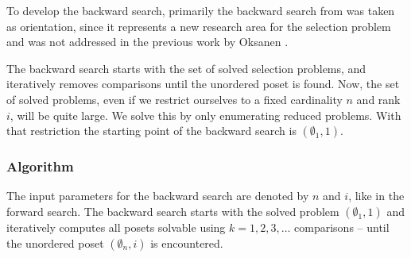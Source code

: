 \documentclass[twoside,leqno,twocolumn]{article}
\begin{document}

To develop the backward search, primarily the backward search from \cite{stober2022lower} was taken as orientation, since it represents a new research area for the selection problem and was not addressed in the previous work by Oksanen \cite{Oksanen}.

The backward search starts with the set of solved selection problems, and iteratively removes comparisons until the unordered poset is found.
Now, the set of solved problems, even if we restrict ourselves to a fixed cardinality $n$ and rank $i$, will be quite large.
We solve this by only enumerating reduced problems.
With that restriction the starting point of the backward search is $(\emptyset_1, 1)$.

%



\subsubsection{Algorithm} \label{sec:backward:algorithm}
The input parameters for the backward search are denoted by $n$ and $i$, like in the forward search.
The backward search starts with the solved problem $(\emptyset_1, 1)$ and iteratively computes all posets solvable using $k = 1, 2, 3, \dots$ comparisons -- until the unordered poset $(\emptyset_n, i)$ is encountered.
\end{document}
